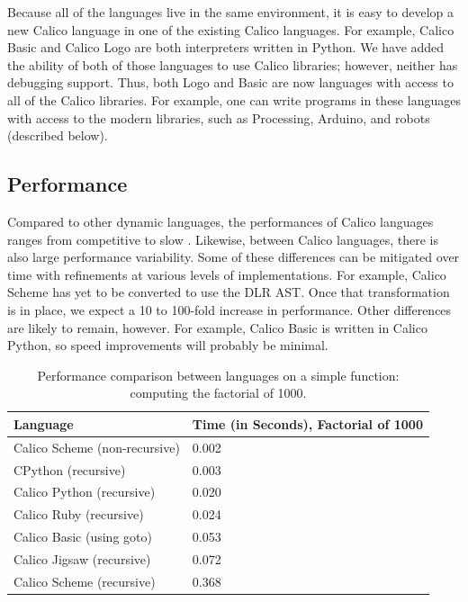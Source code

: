 \documentclass[preprint]{sigplanconf}
\begin{document}
Because all of the languages live in the same environment, it is easy
to develop a new Calico language in one of the existing Calico
languages. For example, Calico Basic and Calico Logo are both
interpreters written in Python. We have added the ability of both of
those languages to use Calico libraries; however, neither has
debugging support. Thus, both Logo and Basic are now languages with
access to all of the Calico libraries. For example, one can write
programs in these languages with access to the modern libraries, such
as Processing, Arduino, and robots (described below).

\subsection{Performance}

Compared to other dynamic languages, the performances of Calico
languages ranges from competitive to slow
\cite{python-benchmark}. Likewise, between Calico languages, there is
also large performance variability. Some of these differences can be
mitigated over time with refinements at various levels of
implementations. For example, Calico Scheme has yet to be converted to
use the DLR AST. Once that transformation is in place, we expect a 10
to 100-fold increase in performance. Other differences are likely to
remain, however. For example, Calico Basic is written in Calico
Python, so speed improvements will probably be minimal.

\begin{table}[h!]\footnotesize
  \centering
  \begin{tabular}{ l | l }
    \hline                        
    \textbf{Language} & \textbf{Time (in Seconds), Factorial of 1000} \\
    \hline                        
    Calico Scheme (non-recursive) & 0.002 \\
    CPython (recursive)           & 0.003 \\
    Calico Python (recursive)     & 0.020 \\
    Calico Ruby (recursive)       & 0.024 \\
    Calico Basic (using goto)     & 0.053 \\
    Calico Jigsaw (recursive)     & 0.072 \\
    Calico Scheme (recursive)     & 0.368 \\
  \end{tabular}
  \caption{Performance comparison between languages on a simple
    function: computing the factorial of 1000.}
  \label{performance}
\end{table}
\end{document}
